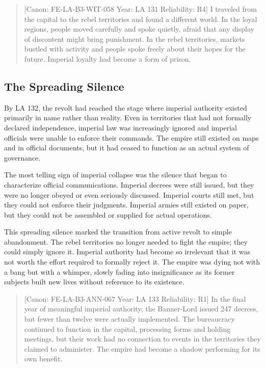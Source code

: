 \begin{quote}
{[}Canon: FE-LA-B3-WIT-058 \textbar{} Year: LA 131 \textbar{}
Reliability: R4{]} I traveled from the capital to the rebel territories
and found a different world. In the loyal regions, people moved
carefully and spoke quietly, afraid that any display of discontent might
bring punishment. In the rebel territories, markets bustled with
activity and people spoke freely about their hopes for the future.
Imperial loyalty had become a form of prison.
\end{quote}

\subsection{The Spreading Silence}\label{the-spreading-silence}

By LA 132, the revolt had reached the stage where imperial authority
existed primarily in name rather than reality. Even in territories that
had not formally declared independence, imperial law was increasingly
ignored and imperial officials were unable to enforce their commands.
The empire still existed on maps and in official documents, but it had
ceased to function as an actual system of governance.

The most telling sign of imperial collapse was the silence that began to
characterize official communications. Imperial decrees were still
issued, but they were no longer obeyed or even seriously discussed.
Imperial courts still met, but they could not enforce their judgments.
Imperial armies still existed on paper, but they could not be assembled
or supplied for actual operations.

This spreading silence marked the transition from active revolt to
simple abandonment. The rebel territories no longer needed to fight the
empire; they could simply ignore it. Imperial authority had become so
irrelevant that it was not worth the effort required to formally reject
it. The empire was dying not with a bang but with a whimper, slowly
fading into insignificance as its former subjects built new lives
without reference to its existence.

\begin{quote}
{[}Canon: FE-LA-B3-ANN-067 \textbar{} Year: LA 133 \textbar{}
Reliability: R1{]} In the final year of meaningful imperial authority,
the Banner-Lord issued 247 decrees, but fewer than twelve were actually
implemented. The bureaucracy continued to function in the capital,
processing forms and holding meetings, but their work had no connection
to events in the territories they claimed to administer. The empire had
become a shadow performing for its own benefit.
\end{quote}

